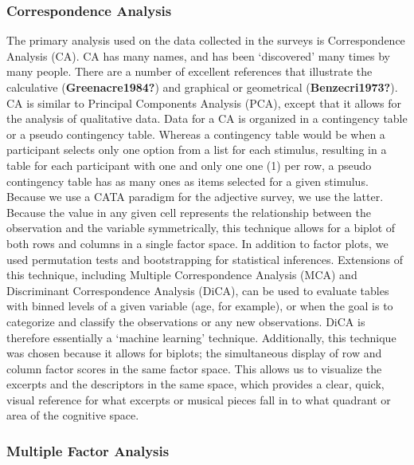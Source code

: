 \documentclass[
  english,
  man,floatsintext]{apa6}
\begin{document}
\hypertarget{correspondence-analysis}{%
\subsubsection{Correspondence Analysis}\label{correspondence-analysis}}

The primary analysis used on the data collected in the surveys is Correspondence Analysis (CA). CA has many names, and has been `discovered' many times by many people. There are a number of excellent references that illustrate the calculative (\textbf{Greenacre1984?}) and graphical or geometrical (\textbf{Benzecri1973?}). CA is similar to Principal Components Analysis (PCA), except that it allows for the analysis of qualitative data. Data for a CA is organized in a contingency table or a pseudo contingency table. Whereas a contingency table would be when a participant selects only one option from a list for each stimulus, resulting in a table for each participant with one and only one one (1) per row, a pseudo contingency table has as many ones as items selected for a given stimulus. Because we use a CATA paradigm for the adjective survey, we use the latter. Because the value in any given cell represents the relationship between the observation and the variable symmetrically, this technique allows for a biplot of both rows and columns in a single factor space. In addition to factor plots, we used permutation tests and bootstrapping for statistical inferences. Extensions of this technique, including Multiple Correspondence Analysis (MCA) and Discriminant Correspondence Analysis (DiCA), can be used to evaluate tables with binned levels of a given variable (age, for example), or when the goal is to categorize and classify the observations or any new observations. DiCA is therefore essentially a `machine learning' technique.
Additionally, this technique was chosen because it allows for biplots; the simultaneous display of row and column factor scores in the same factor space. This allows us to visualize the excerpts and the descriptors in the same space, which provides a clear, quick, visual reference for what excerpts or musical pieces fall in to what quadrant or area of the cognitive space.

\hypertarget{multiple-factor-analysis}{%
\subsubsection{Multiple Factor Analysis}\label{multiple-factor-analysis}}
\end{document}
